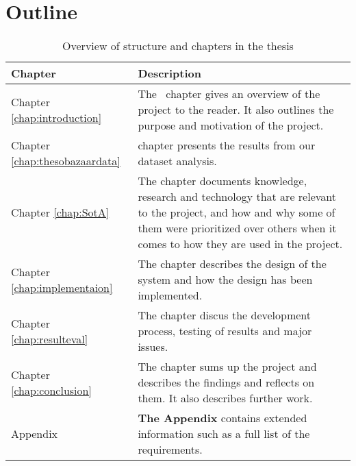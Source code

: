 \section{Outline}
\begin{table}[H]
  \centering
  \begin{tabular}{lp{11cm}}
  \toprule
    \textbf{Chapter}      & \textbf{Description} \\
  \midrule

    Chapter \ref{chap:introduction} & The~\nameref{chap:introduction} chapter gives an overview of the
    project to the reader. It also outlines the purpose and motivation of the
    project.  \\[1.5ex]

    Chapter \ref{chap:thesobazaardata} & \nameref{chap:thesobazaardata} chapter presents the results from our
    dataset analysis. \\[1.5ex]

    Chapter \ref{chap:SotA} & The \nameref{chap:SotA} chapter documents knowledge,
    research and technology that are relevant to the project, and how and why
    some of them were prioritized over others when it comes to how they are
    used in the project. \\[1.5ex]

    Chapter \ref{chap:implementaion} & The \nameref{chap:implementaion} chapter describes the design of the
    system and how the design has been implemented. \\[1.5ex]

    Chapter \ref{chap:resulteval} & The \nameref{chap:resulteval} chapter discus the development process,
    testing of results and major issues. \\[1.5ex]

    Chapter \ref{chap:conclusion} & The \nameref{chap:conclusion} chapter sums up the project and describes the
    findings and reflects on them. It also describes further work.
    \\[1.5ex]

    Appendix & \textbf{The Appendix} contains extended information such as a full list of the requirements. \\

  \bottomrule
  \end{tabular}
  \caption{Overview of structure and chapters in the thesis}
  \label{table-reportstructure}
\end{table}
